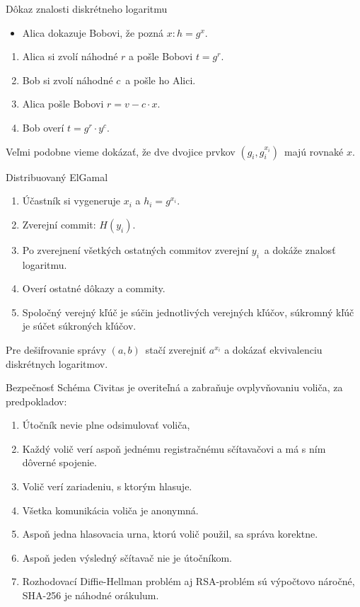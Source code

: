 \documentclass{beamer}
\begin{document}
\begin{frame}{Dôkaz znalosti diskrétneho logaritmu}
    \begin{itemize}
        \item Alica dokazuje Bobovi, že pozná $x : h = g^x$.
    \end{itemize}
    \bigskip
    \begin{enumerate}
        \item Alica si zvolí náhodné $r$ a pošle Bobovi $t = g^r$.
        \item Bob si zvolí náhodné $c$ a pošle ho Alici.
        \item Alica pošle Bobovi $r = v - c \cdot x$.
        \item Bob overí $t = g^r \cdot y^c$.
    \end{enumerate}
    Veľmi podobne vieme dokázať, že dve dvojice prvkov $(g_i, g_i^{x_i})$ majú
    rovnaké $x$.
\end{frame}

\begin{frame}{Distribuovaný ElGamal}
    \begin{enumerate}
        \item Účastník si vygeneruje $x_i$ a $h_i = g^{x_i}$.
        \item Zverejní commit: $H(y_i)$.
        \item Po zverejnení všetkých ostatných commitov zverejní $y_i$ a dokáže znalosť logaritmu.
        \item Overí ostatné dôkazy a commity.
        \item Spoločný verejný kľúč je súčin jednotlivých verejných kľúčov, súkromný kľúč je súčet
        súkroných kľúčov.
    \end{enumerate}

    Pre dešifrovanie správy $(a,b)$ stačí zverejniť $a^{x_i}$ a dokázať ekvivalenciu diskrétnych
    logaritmov.
\end{frame}

\begin{frame}{Bezpečnosť}
    Schéma Civitas je overiteľná a zabraňuje ovplyvňovaniu voliča, za predpokladov:
    \begin{enumerate}
        \item Útočník nevie plne odsimulovať voliča,
        \item Každý volič verí aspoň jednému registračnému sčítavačovi a má s ním dôverné spojenie.
        \item Volič verí zariadeniu, s ktorým hlasuje.
        \item Všetka komunikácia voliča je anonymná.
        \item Aspoň jedna hlasovacia urna, ktorú volič použil, sa správa korektne.
        \item Aspoň jeden výsledný sčítavač nie je útočníkom.
        \item Rozhodovací Diffie-Hellman problém aj RSA-problém sú výpočtovo náročné, SHA-256
        je náhodné orákulum.
    \end{enumerate}
\end{frame}
\end{document}

